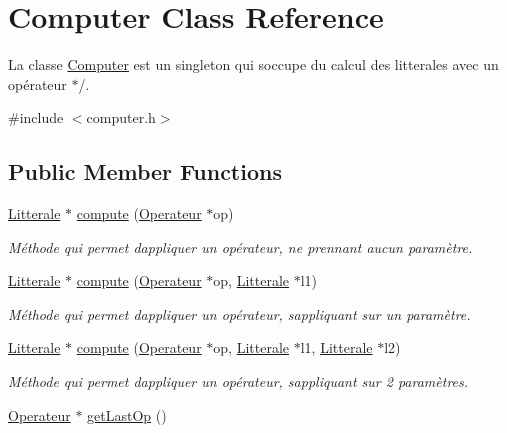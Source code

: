 \hypertarget{class_computer}{}\section{Computer Class Reference}
\label{class_computer}


La classe \hyperlink{class_computer}{Computer} est un singleton qui s\textquotesingle{}occupe du calcul des litterales avec un opérateur $\ast$/.  




{\ttfamily \#include $<$computer.\+h$>$}

\subsection*{Public Member Functions}
\begin{DoxyCompactItemize}
\item 
\hyperlink{class_litterale}{Litterale} $\ast$ \hyperlink{class_computer_a0abcb800a1983fa735ead34f569b9e51}{compute} (\hyperlink{class_operateur}{Operateur} $\ast$op)
\begin{DoxyCompactList}\small\item\em Méthode qui permet d\textquotesingle{}appliquer un opérateur, ne prennant aucun paramètre. \end{DoxyCompactList}\item 
\hyperlink{class_litterale}{Litterale} $\ast$ \hyperlink{class_computer_abb4f32bacba91222d6d98a696af0c401}{compute} (\hyperlink{class_operateur}{Operateur} $\ast$op, \hyperlink{class_litterale}{Litterale} $\ast$l1)
\begin{DoxyCompactList}\small\item\em Méthode qui permet d\textquotesingle{}appliquer un opérateur, s\textquotesingle{}appliquant sur un paramètre. \end{DoxyCompactList}\item 
\hyperlink{class_litterale}{Litterale} $\ast$ \hyperlink{class_computer_a016bf583f6ec6d1c1c71ed9246ecc5bb}{compute} (\hyperlink{class_operateur}{Operateur} $\ast$op, \hyperlink{class_litterale}{Litterale} $\ast$l1, \hyperlink{class_litterale}{Litterale} $\ast$l2)
\begin{DoxyCompactList}\small\item\em Méthode qui permet d\textquotesingle{}appliquer un opérateur, s\textquotesingle{}appliquant sur 2 paramètres. \end{DoxyCompactList}\item 
\hyperlink{class_operateur}{Operateur} $\ast$ \hyperlink{class_computer_a7cb35cf9cdf9f0a89328501a8cbd46dc}{get\+Last\+Op} ()

\end{DoxyCompactItemize}
